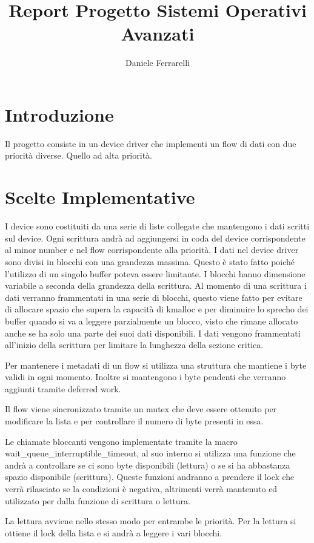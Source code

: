 \documentclass[a4paper,10pt]{article}
\title{Report Progetto Sistemi Operativi Avanzati}
\author{Daniele Ferrarelli}
\date{}
\begin{document}
\maketitle

\section{Introduzione}
Il progetto consiste in un device driver che implementi un flow di dati con due priorità diverse. Quello ad alta priorità.

\section{Scelte Implementative}
I device sono costituiti da una serie di liste collegate che mantengono i dati scritti sul device. Ogni scrittura andrà ad aggiungersi in coda del device corrispondente al minor number e nel flow corrispondente alla priorità. I dati nel device driver sono divisi in blocchi con una grandezza massima. Questo è stato fatto poiché l'utilizzo di un singolo buffer poteva essere limitante. I blocchi hanno dimensione variabile a seconda della grandezza della scrittura. Al momento di una scrittura i dati verranno frammentati in una serie di blocchi, questo viene fatto per evitare di allocare spazio che supera la capacità di kmalloc e per diminuire lo sprecho dei buffer quando si va a leggere parzialmente un blocco, visto che rimane allocato anche se ha solo una parte dei suoi dati disponibili. I dati vengono frammentati all'inizio della scrittura per limitare la lunghezza della sezione critica.

Per mantenere i metadati di un flow si utilizza una struttura che mantiene i byte validi in ogni momento. Inoltre si mantengono i byte pendenti che verranno aggiunti tramite deferred work.

Il flow viene sincronizzato tramite un mutex che deve essere ottenuto per modificare la lista e per controllare il numero di byte presenti in essa.


Le chiamate bloccanti vengono implementate tramite la macro wait\_queue\_interruptible\_timeout, al suo interno si utilizza una funzione che andrà a controllare se ci sono byte disponibili (lettura) o se si ha abbastanza spazio disponibile (scrittura). Queste funzioni andranno a prendere il lock che verrà rilasciato se la condizioni è negativa, altrimenti verrà mantenuto ed utilizzato per dalla funzione di scrittura o lettura.

La lettura avviene nello stesso modo per entrambe le priorità. Per la lettura si ottiene il lock della lista e si andrà a leggere i vari blocchi.
\end{document}
